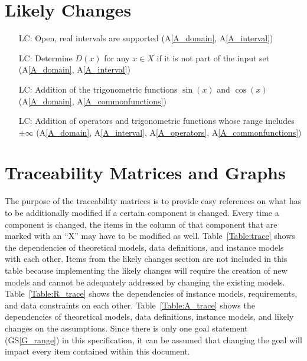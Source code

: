 \documentclass[12pt]{article}
\newcommand{\aref}[1]{A\ref{#1}}
\newcommand{\gsref}[1]{GS\ref{#1}}
\newcounter{lcnum} %
\begin{document}
\section{Likely Changes}    
\label{changes}

\noindent \begin{itemize}

\item[LC\refstepcounter{lcnum}\thelcnum\label{LC_openinterval}:] Open, real 
intervals are supported (\aref{A_domain}, \aref{A_interval})

\item[LC\refstepcounter{lcnum}\thelcnum\label{LC_unknownDomain}:] Determine 
$D(x)$ for any $x \in X$ if it is not part of the input set (\aref{A_domain}, 
\aref{A_interval})

\item[LC\refstepcounter{lcnum}\thelcnum\label{LC_trig}:] Addition of the 
trigonometric functions $\sin(x)$ and $\cos(x)$ (\aref{A_domain}, 
\aref{A_commonfunctions})

\item[LC\refstepcounter{lcnum}\thelcnum\label{LC_infinity}:] Addition of 
operators and trigonometric functions whose range includes $\pm\infty$ 
(\aref{A_domain}, \aref{A_interval}, \aref{A_operators}, 
\aref{A_commonfunctions})

\end{itemize}

\section{Traceability Matrices and Graphs}
\label{trace}

The purpose of the traceability matrices is to provide easy references on what
has to be additionally modified if a certain component is changed.  Every time a
component is changed, the items in the column of that component that are marked
with an ``X'' may have to be modified as well.  Table~\ref{Table:trace} shows 
the dependencies of theoretical models, data definitions, and instance models 
with each other. Items from the likely changes section are not included in this 
table because implementing the likely changes will require the creation of new 
models and cannot be adequately addressed by changing the existing models. 
Table~\ref{Table:R_trace} shows the dependencies of instance models, 
requirements, and data constraints on each other. Table~\ref{Table:A_trace} 
shows the dependencies of theoretical models, data definitions, instance 
models, and likely changes on the assumptions. Since there is only one goal 
statement (\gsref{G_range}) in this specification, it can be assumed that 
changing the goal will impact every item contained within this document.
\end{document}
